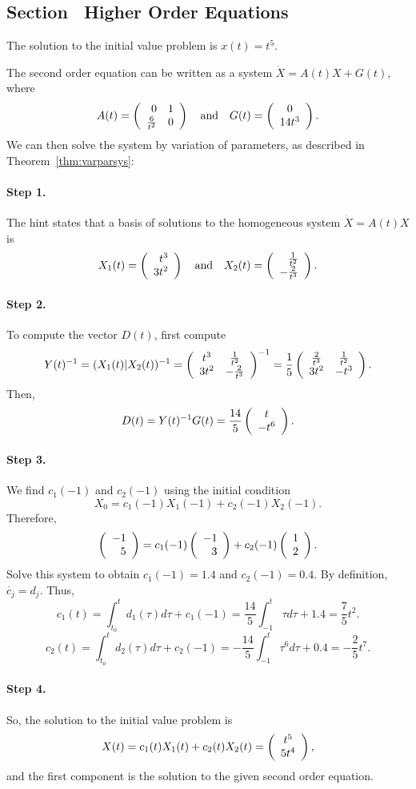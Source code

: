 \subsection*{Section~\protect{\ref{S:RO}} Higher Order Equations}

 \ans The solution to the initial value problem is 
$x(t) = t^5$.

\soln The second order equation can be written as a system
$\dot{X} = A(t)X + G(t)$, where
\[
A(t) = \left(\begin{array}{rr} 0 & 1\\ \frac{6}{t^2} &0\end{array}\right) \quad\mbox{and}\quad G(t) = \left(\begin{array}{c} 0 \\ 14t^3\end{array}\right).
\]
We can then solve the system by variation of parameters, as described in
Theorem~\ref{thm:varparsys}:

\paragraph{Step 1.} The hint states that
a basis of solutions to the homogeneous system
$\dot{X} = A(t)X$ is
\[
X_1(t) = \left(\begin{array}{r} t^3 \\ 3t^2\end{array}\right) \quad\mbox{and}\quad X_2(t) =
\left(\begin{array}{r} \frac{1}{t^2} \\ -\frac{2}{t^3}\end{array}\right).
\]
\paragraph{Step 2.} To compute the vector $D(t)$, first compute
\[
Y(t)^{-1} = (X_1(t)|X_2(t))^{-1} =
\left(\begin{array}{cc} t^3 & \frac{1}{t^2}\\ 3t^2 &-\frac{2}{t^3}\end{array}\right)^{-1} =
\frac{1}{5}\left(\begin{array}{cc} \frac{2}{t^3} & \frac{1}{t^2}\\ 3t^2 &-t^3\end{array}\right).
\]
Then,
\[
D(t) = Y(t)^{-1}G(t) =
\frac{14}{5}\left(\begin{array}{c} t \\ -t^6\end{array}\right).
\]
\paragraph{Step 3.} We find $c_1(-1)$ and $c_2(-1)$ using the initial
condition
\[
X_0 = c_1(-1)X_1(-1) + c_2(-1)X_2(-1).
\]
Therefore,
\[
\left(\begin{array}{r} -1 \\ 5\end{array}\right) = c_1(-1)\left(\begin{array}{r} -1 \\ 3\end{array}\right) + c_2(-1)\left(\begin{array}{r} 1 \\ 2\end{array}\right).
\]
Solve this system to obtain $c_1(-1) = 1.4$ and $c_2(-1) = 0.4$.  By
definition,
$\dot{c_j} = d_j$.  Thus,
\[
c_1(t) = \int_{t_0}^td_1(\tau)d\tau + c_1(-1)
= \frac{14}{5}\int_{-1}^t\tau d\tau + 1.4 = \frac{7}{5}t^2.
\]
\[
c_2(t) = \int_{t_0}^td_2(\tau)d\tau + c_2(-1)
= -\frac{14}{5}\int_{-1}^t\tau^6 d\tau + 0.4= -\frac{2}{5}t^7.
\]
\paragraph{Step 4.} So, the solution to the initial value problem is
\[
X(t) = c_1(t)X_1(t) + c_2(t)X_2(t) = \left(\begin{array}{c} t^5 \\ 5t^4\end{array}\right),
\]
and the first component is the solution to the given second order
equation.


